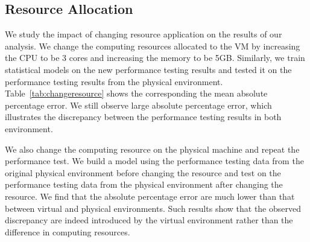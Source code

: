 \subsection{Resource Allocation}
We study the impact of changing resource application on the results of our analysis. We change the computing resources allocated to the VM by increasing the CPU to be 3 cores and increasing the memory to be 5GB. Similarly, we train statistical models on the new performance testing results and tested it on the performance testing results from the physical environment. Table~\ref{tab:changeresource} shows the corresponding the mean absolute percentage error. We still observe large absolute percentage error, which illustrates the discrepancy between the performance testing results in both environment. 

We also change the computing resource on the physical machine and repeat the performance test. We build a model using the performance testing data from the original physical environment before changing the resource and test on the performance testing data from the physical environment after changing the resource. We find that the absolute percentage error are much lower than that between virtual and physical environments. Such results show that the observed discrepancy are indeed introduced by the virtual environment rather than the difference in computing resources.


